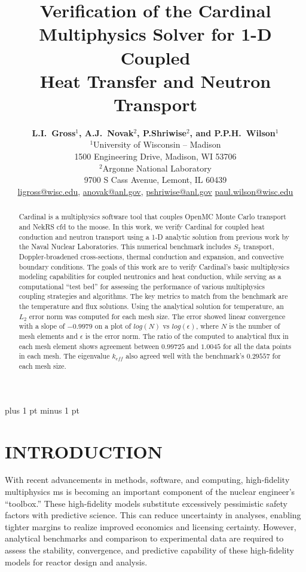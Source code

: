 \documentclass[letterpaper]{mc2023}
\title{Verification of the Cardinal Multiphysics Solver for 1-D Coupled\\
Heat Transfer and Neutron Transport}
\author{%
  \textbf{L.I.~Gross$^1$, A.J.~Novak$^2$, P.Shriwise$^2$, and P.P.H.~Wilson$^1$}\\
  $^1$University of Wisconsin -- Madison  \\
  1500 Engineering Drive, Madison, WI 53706 \vspace{6pt}\\
  $^2$Argonne National Laboratory \\
  9700 S Cass Avenue, Lemont, IL 60439\vspace{6pt} \\
  \url{ligross@wisc.edu}, \url{anovak@anl.gov}, \url{pshriwise@anl.gov} \url{paul.wilson@wisc.edu}
}
\begin{document}
\maketitle
\justify
\parskip 6pt plus 1 pt minus 1 pt

\begin{abstract}
  Cardinal is a multiphysics software tool that couples OpenMC Monte Carlo transport and NekRS \gls{cfd} to the \gls{moose}.
  In this work, we verify Cardinal for coupled heat conduction and neutron transport using a 1-D analytic solution from previous
  work by the Naval Nuclear Laboratories. This numerical benchmark includes $S_2$ transport, Doppler-broadened cross-sections,
  thermal conduction and expansion, and convective boundary conditions. The goals of this work are to verify Cardinal's basic
  multiphysics modeling capabilities for coupled neutronics and heat conduction, while serving as a computational ``test bed''
  for assessing the performance of various multiphysics coupling strategies and algorithms. The key metrics to match from the
  benchmark are the temperature and flux solutions. Using the analytical solution for temperature, an $L_{2}$ error norm was computed
  for each mesh size. The error showed linear convergence with a slope of $-0.9979$ on a plot of $log(N)$ vs $log(\epsilon)$,
  where $N$ is the number of mesh elements and $\epsilon$ is the error norm. The ratio of the computed to analytical flux in
  each mesh element shows agreement between $0.99725$ and $1.0045$ for all the data points in each mesh. The eigenvalue $k_{eff}$
  also agreed well with the benchmark's $0.29557$ for each mesh size.
\end{abstract}
\vspace{6pt}

\section{INTRODUCTION}
\label{sec:intro}
With recent advancements in methods, software, and computing, high-fidelity multiphysics \gls{ms} is becoming an important
component of the nuclear engineer's ``toolbox.'' These high-fidelity models substitute excessively pessimistic safety factors
with predictive science. This can reduce uncertainty in analyses, enabling tighter margins to realize improved economics
and licensing certainty. However, analytical benchmarks and comparison to experimental data are required to assess the stability,
convergence, and predictive capability of these high-fidelity models for reactor design and analysis.
\end{document}
